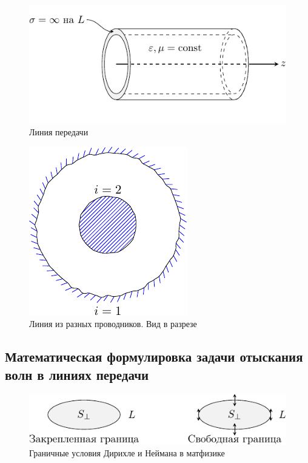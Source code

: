 \begin{figure}[H]
	\centering
	\includegraphics[scale=1.5]{img/lect2_ris1}
	\caption{Линия передачи}
	\label{fig:wavegain:1}
\end{figure}

\begin{figure}[H]
	\centering
	\includegraphics[scale=1.5]{img/lect2_ris2}
	\caption{Линия из разных проводников. Вид в разрезе}
	\label{fig:wavegain:2}
\end{figure}

\subsection{Математическая формулировка задачи отыскания волн в линиях передачи}

\begin{figure}[H]
	\centering
	\includegraphics[scale=1.5]{img/lect2_ris3}
	\caption{Граничные условия Дирихле и Неймана в матфизике}
	\label{fig:wavegain:3}
\end{figure}

